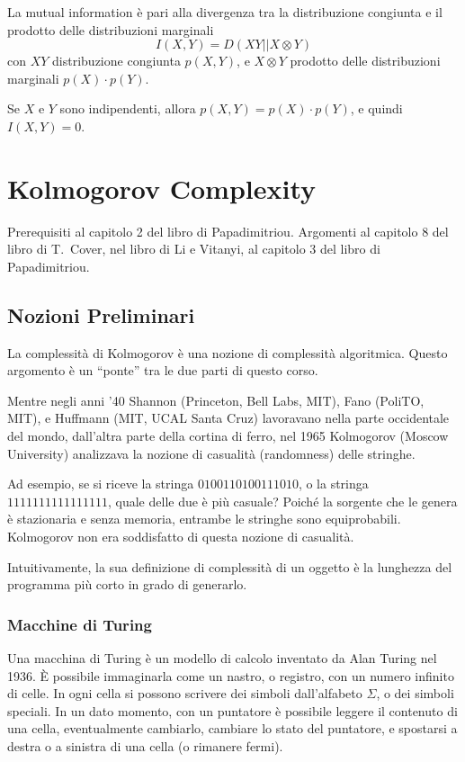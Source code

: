 \begin{theorem}
    La mutual information è pari alla divergenza tra la distribuzione congiunta e il prodotto delle distribuzioni marginali
    $$
        I(X,Y) = D(XY||X\otimes Y)
    $$
    con $XY$ distribuzione congiunta $p(X,Y)$, e $X\otimes Y$ prodotto delle distribuzioni marginali $p(X)\cdot p(Y)$.
\end{theorem}
Se $X$ e $Y$ sono indipendenti, allora $p(X,Y) = p(X)\cdot p(Y)$, e quindi $I(X,Y)=0$.




\chapter{Kolmogorov Complexity}
Prerequisiti al capitolo 2 del libro di Papadimitriou. Argomenti al capitolo 8 del libro di T.~Cover, nel libro di Li e Vitanyi, al capitolo 3 del libro di Papadimitriou.

\section{Nozioni Preliminari}
La complessità di Kolmogorov è una nozione di complessità algoritmica. Questo argomento è un ``ponte'' tra le due parti di questo corso.

Mentre negli anni '40 Shannon (Princeton, Bell Labs, MIT), Fano (PoliTO, MIT), e Huffmann (MIT, UCAL Santa Cruz) lavoravano nella parte occidentale del mondo, dall'altra parte della cortina di ferro, nel 1965 Kolmogorov (Moscow University) analizzava la nozione di casualità (randomness) delle stringhe.

Ad esempio, se si riceve la stringa $0100110100111010$, o la stringa $1111111111111111$, quale delle due è più casuale? Poiché la sorgente che le genera è stazionaria e senza memoria, entrambe le stringhe sono equiprobabili. Kolmogorov non era soddisfatto di questa nozione di casualità.

Intuitivamente, la sua definizione di complessità di un oggetto è la lunghezza del programma più corto in grado di generarlo.


\subsection{Macchine di Turing}
Una macchina di Turing è un modello di calcolo inventato da Alan Turing nel 1936. È possibile immaginarla come un nastro, o registro, con un numero infinito di celle. In ogni cella si possono scrivere dei simboli dall'alfabeto $\Sigma$, o dei simboli speciali. In un dato momento, con un puntatore è possibile leggere il contenuto di una cella, eventualmente cambiarlo, cambiare lo stato del puntatore, e spostarsi a destra o a sinistra di una cella (o rimanere fermi). 

